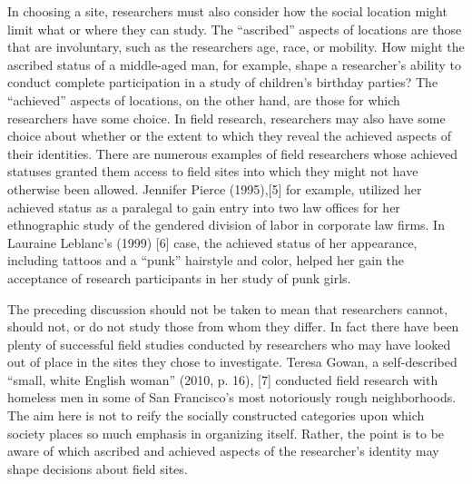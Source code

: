 In choosing a site, researchers must also consider how the social location might limit what or where they can study. The ``ascribed'' aspects of locations are those that are involuntary, such as the researchers age, race, or mobility. How might the ascribed status of a middle-aged man, for example, shape a researcher's ability to conduct complete participation in a study of children's birthday parties? The ``achieved'' aspects of locations, on the other hand, are those for which researchers have some choice. In field research, researchers may also have some choice about whether or the extent to which they reveal the achieved aspects of their identities. There are numerous examples of field researchers whose achieved statuses granted them access to field sites into which they might not have otherwise been allowed. Jennifer Pierce (1995),[5] for example, utilized her achieved status as a paralegal to gain entry into two law offices for her ethnographic study of the gendered division of labor in corporate law firms. In Lauraine Leblanc’s (1999) [6] case, the achieved status of her appearance, including tattoos and a ``punk'' hairstyle and color, helped her gain the acceptance of research participants in her study of punk girls.

The preceding discussion should not be taken to mean that researchers cannot, should not, or do not study those from whom they differ. In fact there have been plenty of successful field studies conducted by researchers who may have looked out of place in the sites they chose to investigate. Teresa Gowan, a self-described ``small, white English woman'' (2010, p. 16), [7] conducted field research with homeless men in some of San Francisco’s most notoriously rough neighborhoods. The aim here is not to reify the socially constructed categories upon which society places so much emphasis in organizing itself. Rather, the point is to be aware of which ascribed and achieved aspects of the researcher's identity may shape decisions about field sites.

